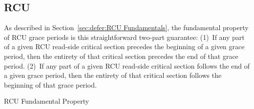 






\subsection{RCU}
\label{sec:memorder:RCU}

As described in
Section~\ref{sec:defer:RCU Fundamentals},
the fundamental property of RCU grace periods is this straightforward
two-part guarantee:
(1)~If any part of a given RCU read-side critical section precedes
the beginning of a given grace period, then the entirety of that
critical section precedes the end of that grace period.
(2)~If any part of a given RCU read-side critical section follows
the end of a given grace period, then the entirety of that
critical section follows the beginning of that grace period.

\begin{listing}[tb]

\caption{RCU Fundamental Property}
\label{lst:memorder:RCU Fundamental Property}
\end{listing}

